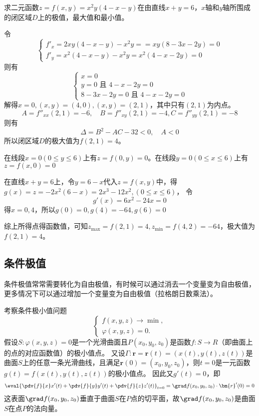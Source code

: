 \begin{example}
    求二元函数$z=f(x,y)=x^2y(4-x-y)$在由直线$x+y=6$，$x$轴和$y$轴所围成的闭区域$D$上的极值，最大值和最小值。
\end{example}
\begin{solution}
    令
    \[
        \begin{cases}
            f'_x  = 2xy(4-x-y) - x^2y = = xy(8-3x-2y) =  0 \\
            f'_y  = x^2(4-x-y) - x^2y = x^2(4-x-2y) = 0
        \end{cases}
    \]
    则有
    \[
        \begin{cases}
            x = 0                        \\
            y = 0 \text{ 且~} 4-x-2y = 0 \\
            8-3x-2y = 0 \text{ 且~} 4-x-2y = 0
        \end{cases}
    \]
    解得$x=0, (x,y)=(4,0), (x,y)=(2,1)$，其中只有$(2,1)$为内点。
    \[ A = f''_{xx}(2,1) = -6 ,\quad B = f''_{xy}(2,1) = -4, C = f''_{yy}(2,1) = -8 \]
    则有
    \[ \Delta = B^2 -AC -32 < 0,\quad A < 0 \]
    所以闭区域$D$的极大值为$f(2,1)=4$。

    在线段$x=0(0\leq y \leq 6)$上有$z=f(0,y)=0$。在线段$y=0(0\leq x\leq 6)$上有$z=f(x,0)=0$

    在直线$x+y=6$上，令$y=6-x$代入$z=f(x,y)$中，得$g(x) = z =-2x^2(6-x)=2x^3-12x^2,(0\leq x\leq 6)$，
    令
    \[ g'(x) = 6x^2 -24x =0 \]
    得$x = {0, 4}$，所以$g(0) = 0, g(4) = -64, g(6) = 0$

    综上所得点得函数值，可知$z_{\max} = f(2,1) = 4, z_{\min} = f(4,2) = -64$，极大值为$f(2,1)=4$。


\end{solution}

\subsection{条件极值}
条件极值常常需要转化为自由极值，有时候可以通过消去一个变量变为自由极值，更多情况下可以通过增加一个变量变为自由极值（拉格朗日数乘法）。

考察条件极小值问题
\[
    \begin{cases}
        f(x,y,z) \to \min, \\
        \varphi(x,y,z) = 0.
    \end{cases}
\]
假设$S:\varphi(x,y,z)=0$是一个光滑曲面且$P(x_0,y_0,z_0)$是函数$f:S\to R$（即曲面上的点的对应函数值）的极小值点。
又设$\Gamma : \bm{r} = \bm{r}(t) = (x(t),y(t),z(t))$是曲面$S$上的任意一条光滑曲线，且满足$\bm{r}(0)=(x_0,y_0,z_0)$，则$t=0$是一元函数$g(t)=f(x(t),y(t),z(t))$的极小值点。
因此又$g'(t)=0$，即
\[
    \eval{\pdv{f}{x}x'(t) + \pdv{f}{y}y'(t) + \pdv{f}{z}z'(t)}_{t=0}
    =
    \grad f(x_0,y_0,z_0) \cdot \bm{r}'(0) = 0
\]
这表面$\grad f(x_0,y_0,z_0)$垂直于曲面$S$在$P$点的切平面，故$\grad f(x_0,y_0,z_0)$是曲面$S$在点$P$的法向量。

